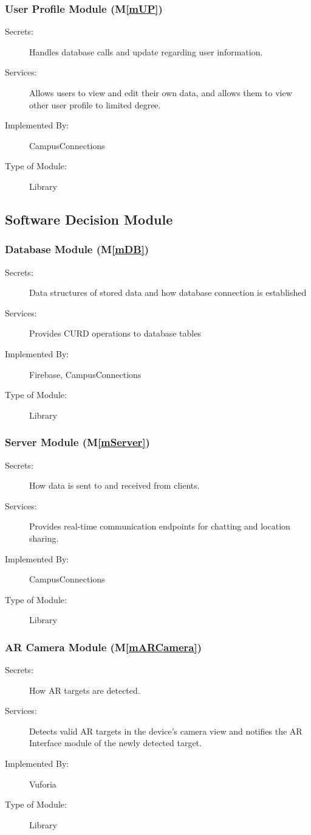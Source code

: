 \documentclass[12pt, titlepage]{article}
\newcommand{\mref}[1]{M\ref{#1}}
\begin{document}
\subsubsection{User Profile Module (\mref{mUP})}
\begin{description}
  \item[Secrets:]Handles database calls and update regarding user information.
  \item[Services:]Allows users to view and edit their own data, and allows them to view other user profile to limited degree.
  \item[Implemented By:] CampusConnections
  \item[Type of Module:] Library
  \end{description}

\subsection{Software Decision Module}

\subsubsection{Database Module (\mref{mDB})}
\begin{description}
\item[Secrets:]Data structures of stored data and how database connection is established
\item[Services:]Provides CURD operations to database tables
\item[Implemented By:] Firebase, CampusConnections
\item[Type of Module:] Library
\end{description}

\subsubsection{Server Module (\mref{mServer})}
\begin{description}
\item[Secrets:]How data is sent to and received from clients.
\item[Services:]Provides real-time communication endpoints for chatting and location sharing.
\item[Implemented By:] CampusConnections
\item[Type of Module:] Library
\end{description}

\subsubsection{AR Camera Module (\mref{mARCamera})}
\begin{description}
\item[Secrets:]How AR targets are detected.
\item[Services:]Detects valid AR targets in the device's camera view and notifies the AR Interface module of the newly detected target.
\item[Implemented By:] Vuforia
\item[Type of Module:] Library
\end{description}
\end{document}
